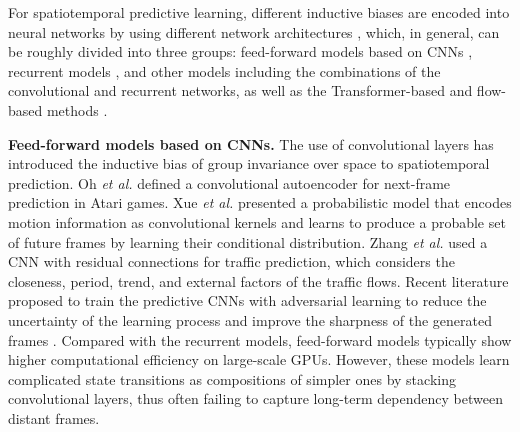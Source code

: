 \documentclass[10pt,journal,compsoc]{IEEEtran}
\newcommand{\myparagraph}[1]{\vspace{5pt} \noindent \textbf{#1.}}
\begin{document}
For spatiotemporal predictive learning, different inductive biases are encoded into neural networks by using different network architectures \cite{oprea2020review}, which, in general, can be roughly divided into three groups: feed-forward models based on CNNs  \cite{Oh2015Action,Mathieu2015Deep,tulyakov2018mocogan}, recurrent models \cite{srivastava2015unsupervised,shi2015convolutional,babaeizadeh2017stochastic}, and other models including the combinations of the convolutional and recurrent networks, as well as the Transformer-based and flow-based methods \cite{weissenborn2019scaling,kumar2019videoflow}.

\myparagraph{Feed-forward models based on CNNs}
The use of convolutional layers has introduced the inductive bias of group invariance over space to spatiotemporal prediction.
Oh \textit{et al.} \cite{Oh2015Action} defined a convolutional autoencoder for next-frame prediction in Atari games. 
Xue \textit{et al.} \cite{xue2016visual}
presented a probabilistic model that encodes motion information as convolutional kernels and learns to produce a probable set of future frames by learning their conditional distribution.
Zhang \textit{et al.} \cite{zhang2017deep} used a CNN with residual connections for traffic prediction, which considers the closeness, period, trend, and external factors of the traffic flows.
Recent literature proposed to train the predictive CNNs with adversarial learning \cite{Goodfellow2014Generative,Denton2015Deep} to reduce the uncertainty of the learning process and improve the sharpness of the generated frames \cite{Mathieu2015Deep,bhattacharjee2017temporal,liang2017dual,tulyakov2018mocogan,wu2020future,gur2020hierarchical,liu2021deep}.
Compared with the recurrent models, feed-forward models typically show higher computational efficiency on large-scale GPUs.
However, these models learn complicated state transitions as compositions of simpler ones by stacking convolutional layers, thus often failing to capture long-term dependency between distant frames.
\end{document}
